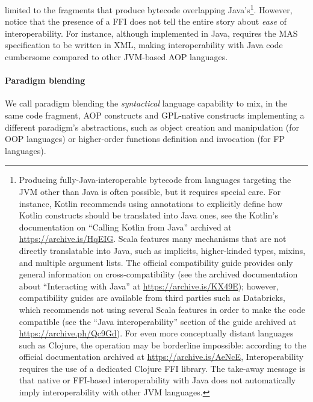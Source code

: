 limited to the fragments that produce bytecode overlapping Java's\footnote{
    Producing fully-Java-interoperable bytecode from languages targeting the JVM other than Java is often possible,
    but it requires special care.
    For instance,
    Kotlin recommends using annotations to explicitly define how Kotlin constructs should be translated into Java ones,
    see the Kotlin's documentation on ``Calling Kotlin from Java''
    archived at \url{https://archive.is/HqEIG}.
    Scala features many mechanisms that are not directly translatable into Java,
    such as implicits, higher-kinded types, mixins, and multiple argument lists.
    The official compatibility guide provides only general information on cross-compatibility
    (see the archived documentation about ``Interacting with Java'' at \url{https://archive.is/KX49E});
    however,
    compatibility guides are available from third parties such as Databricks,
    which recommends not using several Scala features in order to make the code compatible
    (see the ``Java interoperability'' section of the guide archived at \url{https://archive.ph/Qc9Gd}).
    For even more conceptually distant languages such as Clojure,
    the operation may be borderline impossible:
    according to the official documentation archived at \url{https://archive.is/AeNcE},
    Interoperability requires the use of a dedicated Clojure \ac{FFI} library.
    The take-away message is that native or \ac{FFI}-based interoperability with Java
    does not automatically imply interoperability with other \ac{JVM} languages.
}.
%
However,
notice that the presence of a \ac{FFI} does not tell the entire story about \emph{ease} of interoperability.
%
For instance,
although implemented in Java,
\jadex{} requires the \ac{MAS} specification to be written in XML,
making interoperability with Java code cumbersome
compared to other \ac{JVM}-based \ac{AOP} languages.

\paragraph{Paradigm blending}
%
We call paradigm blending the \emph{syntactical} language capability to mix,
in the same code fragment,
\ac{AOP} constructs and \ac{GPL}-native constructs implementing a different paradigm's abstractions,
such as object creation and manipulation (for \ac{OOP} languages)
or higher-order functions definition and invocation (for \ac{FP} languages).

